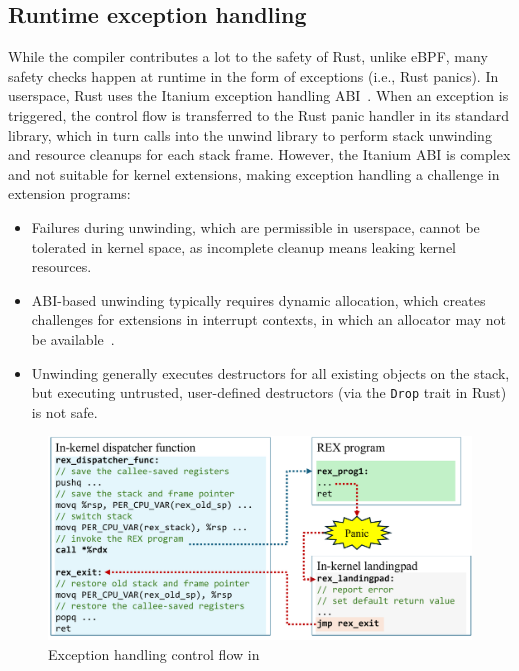 \subsection{Runtime exception handling}
\label{principle:eh}
While the compiler contributes a lot to the safety of Rust, unlike eBPF, many
    safety checks happen at runtime in the form of exceptions (i.e., Rust
    panics).
In userspace, Rust uses the Itanium exception handling ABI~\cite{itanium-abi}.
When an exception is triggered, the control flow is transferred to the Rust
    panic handler in its standard library, which in turn calls into the unwind
    library to perform stack unwinding and resource cleanups for each stack
    frame.
However, the Itanium ABI is complex and not suitable for kernel extensions,
    making exception handling a challenge in \projname{} extension programs:
\begin{itemize}
    \item Failures during unwinding, which are permissible in userspace, cannot
        be tolerated in kernel space, as incomplete cleanup means leaking
        kernel resources.
    \item ABI-based unwinding typically requires dynamic allocation, which
        creates challenges for extensions in interrupt contexts, in which an
        allocator may not be available~\cite{bpf-mempool-lwn}. 
    \item Unwinding generally executes destructors for all existing objects on
        the stack, but executing untrusted, user-defined destructors (via the
        \texttt{\small Drop} trait in Rust) is not safe.
\end{itemize}

\begin{figure}
    \includegraphics[width=1.0\linewidth]{figs/exception_handling.pdf}
    \centering
    \vspace{-10pt}
    \caption{Exception handling control flow in \projname{}}
    \label{fig:eh-overview}
    \vspace{-10pt}
\end{figure}

